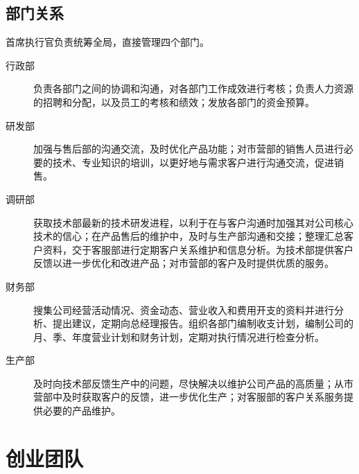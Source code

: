 \documentclass[violet]{main}
\begin{document}
			\subsection{部门关系}
				首席执行官负责统筹全局，直接管理四个部门。
				\begin{description}
					\item[行政部]负责各部门之间的协调和沟通，对各部门工作成效进行考核；负责人力资源的招聘和分配，以及员工的考核和绩效；发放各部门的资金预算。
					\item[研发部]加强与售后部的沟通交流，及时优化产品功能；对市营部的销售人员进行必要的技术、专业知识的培训，以更好地与需求客户进行沟通交流，促进销售。
					\item[调研部]获取技术部最新的技术研发进程，以利于在与客户沟通时加强其对公司核心技术的信心；在产品售后的维护中，及时与生产部沟通和交接；整理汇总客户资料，交于客服部进行定期客户关系维护和信息分析。为技术部提供客户反馈以进一步优化和改进产品；对市营部的客户及时提供优质的服务。
					\item[财务部]搜集公司经营活动情况、资金动态、营业收入和费用开支的资料并进行分析、提出建议，定期向总经理报告。组织各部门编制收支计划，编制公司的月、季、年度营业计划和财务计划，定期对执行情况进行检查分析。
					\item[生产部]及时向技术部反馈生产中的问题，尽快解决以维护公司产品的高质量；从市营部中及时获取客户的反馈，进一步优化生产；对客服部的客户关系服务提供必要的产品维护。
				\end{description}
		\section{创业团队}
\end{document}

